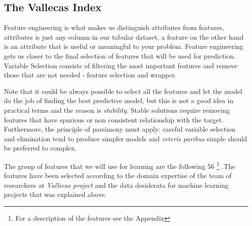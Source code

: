 \documentclass[11pt]{article}
\theoremstyle{definition}
\theoremstyle{remark}
\begin{document}
\subsection{The Vallecas Index}
\label{sse:vs}
Feature engineering is what makes us distinguish attributes from features, attributes is just any column in our tabular dataset, a feature on the other hand is an attribute that is useful or meaningful to your problem. Feature engineering gets us closer to the final selection of features that will be used for prediction. 
Variable Selection consists of filtering the most important features and remove those that are not needed - feature selection and wrapper.


Note that it could be always possible to select all the features and let the model do the job of finding the best predictive model, but this is not a good idea in practical terms and the reason is \emph{stability}. Stable solutions require removing features that have spurious or non consistent relationship with the target. Furthermore, the principle of parsimony must apply: careful variable selection and elimination tend to produce simpler models and \emph{ceteris paribus} simple should be preferred to complex.

The group of features that we will use for learning are the following 56 \footnote{For a description of the features see the Appendix} .The features have been selected according to the domain expertise of the team of researchers at \emph{Vallecas project} and the data desiderata for machine learning projects that was explained above. 
\end{document}
